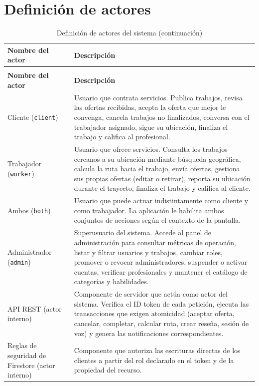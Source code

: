 \documentclass[doc,12pt,a4paper]{apa7}
\begin{document}
\section{Definición de actores}

\begin{longtable}{|P{3.3cm}|L{11.2cm}|}
\caption{Definición de actores del sistema}\\
\hline
\textbf{Nombre del actor} & \textbf{Descripción} \\ \hline
\endfirsthead
\caption[]{Definición de actores del sistema (continuación)}\\
\hline
\textbf{Nombre del actor} & \textbf{Descripción} \\ \hline
\endhead
\hline
\endfoot



Cliente (\texttt{client}) & Usuario que contrata servicios. Publica trabajos, revisa las ofertas recibidas, acepta la oferta que mejor le convenga, cancela trabajos no finalizados, conversa con el trabajador asignado, sigue su ubicación, finaliza el trabajo y califica al profesional. \\ \hline

Trabajador (\texttt{worker}) & Usuario que ofrece servicios. Consulta los trabajos cercanos a su ubicación mediante búsqueda geográfica, calcula la ruta hacia el trabajo, envía ofertas, gestiona sus propias ofertas (editar o retirar), reporta su ubicación durante el trayecto, finaliza el trabajo y califica al cliente. \\ \hline

Ambos (\texttt{both}) & Usuario que puede actuar indistintamente como cliente y como trabajador. La aplicación le habilita ambos conjuntos de acciones según el contexto de la pantalla. \\ \hline

Administrador (\texttt{admin}) & Superusuario del sistema. Accede al panel de administración para consultar métricas de operación, listar y filtrar usuarios y trabajos, cambiar roles, promover o revocar administradores, suspender o activar cuentas, verificar profesionales y mantener el catálogo de categorías y habilidades. \\ \hline

API REST (actor interno) & Componente de servidor que actúa como actor del sistema. Verifica el ID token de cada petición, ejecuta las transacciones que exigen atomicidad (aceptar oferta, cancelar, completar, calcular ruta, crear reseña, sesión de voz) y genera las notificaciones correspondientes. \\ \hline

Reglas de seguridad de Firestore (actor interno) & Componente que autoriza las escrituras directas de los clientes a partir del rol declarado en el token y de la propiedad del recurso. \\ \hline

\end{longtable}
\end{document}
